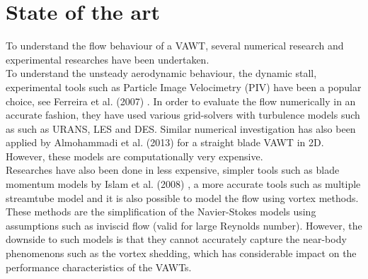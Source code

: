 \section{State of the art}


To understand the flow behaviour of a VAWT, several numerical research \cite{Almohammadi2013} \cite{Ferreira2007} \cite{Islam2008} \cite{Merz2012} and experimental researches \cite{SimaoFerreira2008} \cite{Ferreira} \cite{Howell2010} \cite{Mertens2003} have been undertaken.\\

To understand the unsteady aerodynamic behaviour, the dynamic stall, experimental tools such as Particle Image Velocimetry (PIV) have been a popular choice, see Ferreira et al. (2007) \cite{Ferreira2007}. In order to evaluate the flow numerically in an accurate fashion, they have used various grid-solvers with turbulence models such as such as URANS, LES and DES. Similar numerical investigation has also been applied by Almohammadi et al. (2013) \cite{Almohammadi2013} for a straight blade VAWT in 2D. However, these models are computationally very expensive.\\

Researches have also been done in less expensive, simpler tools such as blade momentum models by Islam et al. (2008) \cite{Islam2008}, a more accurate tools such as multiple streamtube model and it is also possible to model the flow using vortex methods. These methods are the simplification of the Navier-Stokes models using assumptions such as inviscid flow (valid for large Reynolds number). However, the downside to such models is that they cannot accurately capture the near-body phenomenons such as the vortex shedding, which has considerable impact on the performance characteristics of the VAWTs.\\

